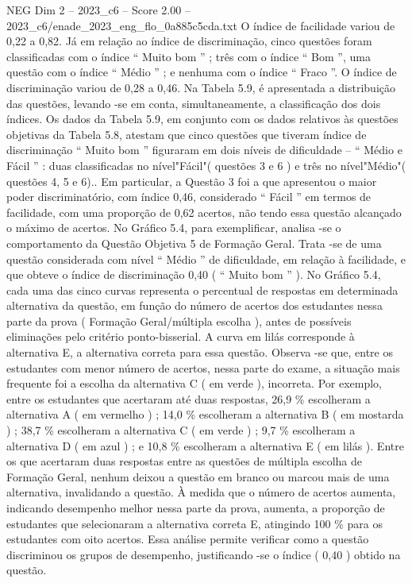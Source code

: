 \begin{textsample}{NEG Dim 2 – 2023\_c6 – Score 2.00 – 2023\_c6/enade\_2023\_eng\_flo\_0a885c5cda.txt}
O índice de facilidade variou de 0,22 a 0,82.
Já em relação ao índice de discriminação, cinco questões foram classificadas com o índice “ Muito bom ” ; três com o índice “ Bom ”, uma questão com o índice “ Médio ” ; e nenhuma com o índice “ Fraco ”.
O índice de discriminação variou de 0,28 a 0,46.
Na Tabela 5.9, é apresentada a distribuição das questões, levando -se em conta, simultaneamente, a classificação dos dois índices.
Os dados da Tabela 5.9, em conjunto com os dados relativos às questões objetivas da Tabela 5.8, atestam que cinco questões que tiveram índice de discriminação “ Muito bom ” figuraram em dois níveis de dificuldade – “ Médio e Fácil ” : duas classificadas no nível"Fácil"( questões 3 e 6 ) e três no nível"Médio"( questões 4, 5 e 6)..
Em particular, a Questão 3 foi a que apresentou o maior poder discriminatório, com índice 0,46, considerado “ Fácil ” em termos de facilidade, com uma proporção de 0,62 acertos, não tendo essa questão alcançado o máximo de acertos.
No Gráfico 5.4, para exemplificar, analisa -se o comportamento da Questão Objetiva 5 de Formação Geral.
Trata -se de uma questão considerada com nível “ Médio ” de dificuldade, em relação à facilidade, e que obteve o índice de discriminação 0,40 ( “ Muito bom ” ).
No Gráfico 5.4, cada uma das cinco curvas representa o percentual de respostas em determinada alternativa da questão, em função do número de acertos dos estudantes nessa parte da prova ( Formação Geral/múltipla escolha ), antes de possíveis eliminações pelo critério ponto-bisserial.
A curva em lilás corresponde à alternativa E, a alternativa correta para essa questão.
Observa -se que, entre os estudantes com menor número de acertos, nessa parte do exame, a situação mais frequente foi a escolha da alternativa C ( em verde ), incorreta.
Por exemplo, entre os estudantes que acertaram até duas respostas, 26,9 \% escolheram a alternativa A ( em vermelho ) ; 14,0 \% escolheram a alternativa B ( em mostarda ) ; 38,7 \% escolheram a alternativa C ( em verde ) ; 9,7 \% escolheram a alternativa D ( em azul ) ; e 10,8 \% escolheram a alternativa E ( em lilás ).
Entre os que acertaram duas respostas entre as questões de múltipla escolha de Formação Geral, nenhum deixou a questão em branco ou marcou mais de uma alternativa, invalidando a questão.
À medida que o número de acertos aumenta, indicando desempenho melhor nessa parte da prova, aumenta, a proporção de estudantes que selecionaram a alternativa correta E, atingindo 100 \% para os estudantes com oito acertos.
Essa análise permite verificar como a questão discriminou os grupos de desempenho, justificando -se o índice ( 0,40 ) obtido na questão.

\end{textsample}
